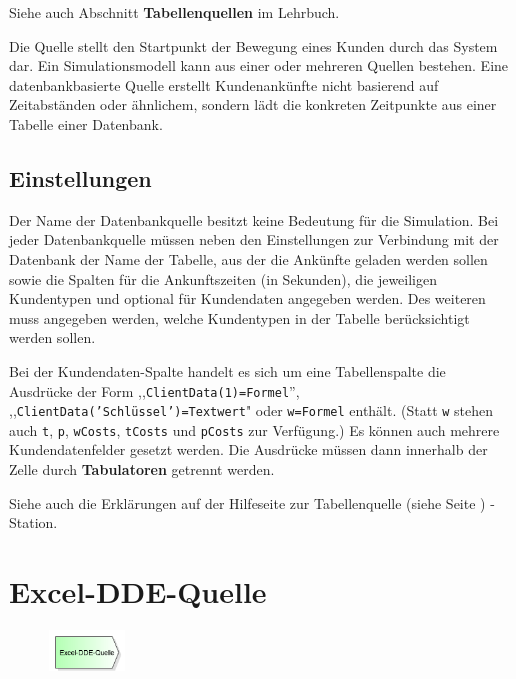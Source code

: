 Siehe auch Abschnitt \textbf{Tabellenquellen} im Lehrbuch.

Die Quelle stellt den Startpunkt der Bewegung eines Kunden durch das System dar.
Ein Simulationsmodell kann aus einer oder mehreren Quellen bestehen.
Eine datenbankbasierte Quelle erstellt Kundenankünfte nicht basierend auf
Zeitabständen oder ähnlichem, sondern lädt die konkreten Zeitpunkte aus einer
Tabelle einer Datenbank.

\subsection*{Einstellungen}

Der Name der Datenbankquelle besitzt keine Bedeutung für die Simulation.
Bei jeder Datenbankquelle müssen neben den Einstellungen zur Verbindung mit
der Datenbank der Name der Tabelle, aus der die Ankünfte geladen werden sollen
sowie die Spalten für die Ankunftszeiten (in Sekunden), die jeweiligen Kundentypen
und optional für Kundendaten angegeben werden. Des weiteren muss angegeben werden,
welche Kundentypen in der Tabelle berücksichtigt werden sollen.

Bei der Kundendaten-Spalte handelt es sich um eine Tabellenspalte die Ausdrücke
der Form ,,\texttt{ClientData(1)=Formel}'', ,,\texttt{ClientData('Schlüssel')=Textwert}"
oder \texttt{w=Formel} enthält. (Statt \texttt{w} stehen auch \texttt{t}, \texttt{p},
\texttt{wCosts}, \texttt{tCosts} und \texttt{pCosts} zur Verfügung.)
Es können auch mehrere Kundendatenfelder gesetzt werden.
Die Ausdrücke müssen dann innerhalb der Zelle durch \textbf{Tabulatoren} getrennt werden.

Siehe auch die Erklärungen auf der Hilfeseite zur Tabellenquelle (siehe Seite \pageref{ref:ModelElementSourceTable}) -Station.


\section{Excel-DDE-Quelle}
\label{ref:ModelElementSourceDDE}

\begin{figure}
\vspace{-22pt}
\includegraphics[width=2cm]{imageModelElementSourceDDE.png}
\vspace{-22pt}
\end{figure}

